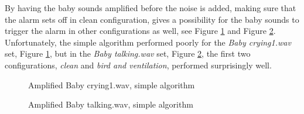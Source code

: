 By having the baby sounds amplified before the noise is added, making sure that the alarm sets off in clean configuration, 
gives a possibility for the baby sounds to trigger the alarm in other configurations as well, see Figure \ref{fig:bc2_simp_amped} and Figure \ref{fig:bt_simp_amped}.
Unfortunately, the simple algorithm performed poorly for the \emph{Baby crying1.wav} set, Figure \ref{fig:bc2_simp_amped}, but in 
the \emph{Baby talking.wav} set, Figure \ref{fig:bt_simp_amped}, the first two configurations, \emph{clean} and \emph{bird and ventilation}, 
performed surprisingly well.

\begin{figure}[H]
  \centering
  \caption{Amplified Baby crying1.wav, simple algorithm}
  \label{fig:bc2_simp_amped}
\end{figure}
\begin{figure}[H]
  \centering
  \caption{Amplified Baby talking.wav, simple algorithm}
  \label{fig:bt_simp_amped}
\end{figure}

